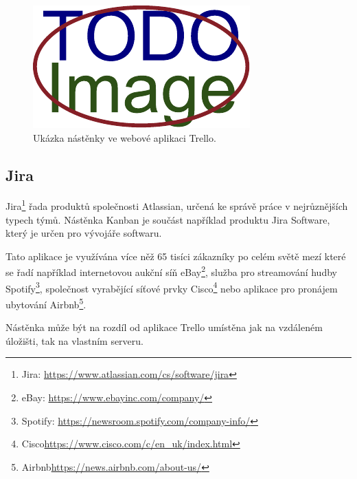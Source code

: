 \begin{figure}[H]
	\centering
	\includegraphics[width=\textwidth]{obrazky-figures/placeholder.pdf}
	\caption{Ukázka nástěnky ve webové aplikaci Trello.}
\end{figure}

\subsection{Jira}
Jira\footnote{Jira: \url{https://www.atlassian.com/cs/software/jira}} řada produktů společnosti Atlassian, určená ke správě práce v nejrůznějších typech týmů. Nástěnka Kanban je součást například produktu Jira Software, který je určen pro vývojáře softwaru. 



Tato aplikace je využívána více něž 65 tisíci zákazníky po celém světě mezí které se řadí například internetovou aukční síň eBay\footnote{eBay: \url{https://www.ebayinc.com/company/}}, služba pro streamování hudby Spotify\footnote{Spotify: \url{https://newsroom.spotify.com/company-info/}}, společnost vyrabějící síťové prvky Cisco\footnote{Cisco\url{https://www.cisco.com/c/en_uk/index.html}} nebo aplikace pro pronájem ubytování Airbnb\footnote{Airbnb\url{https://news.airbnb.com/about-us/}}.

Nástěnka může být na rozdíl od aplikace Trello umístěna jak na vzdáleném úložišti, tak na vlastním serveru.

